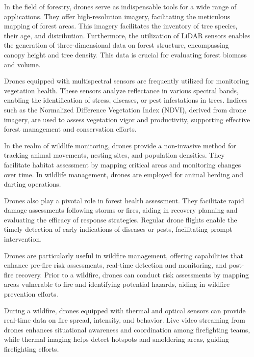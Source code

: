 \documentclass[
  12 pt,
]{Nemilov}
\begin{document}
In the field of forestry, drones serve as indispensable tools for a wide range of applications. They offer high-resolution imagery, facilitating the meticulous mapping of forest areas. This imagery facilitates the inventory of tree species, their age, and distribution. Furthermore, the utilization of LiDAR sensors enables the generation of three-dimensional data on forest structure, encompassing canopy height and tree density. This data is crucial for evaluating forest biomass and volume.

Drones equipped with multispectral sensors are frequently utilized for monitoring vegetation health. These sensors analyze reflectance in various spectral bands, enabling the identification of stress, diseases, or pest infestations in trees. Indices such as the Normalized Difference Vegetation Index (NDVI), derived from drone imagery, are used to assess vegetation vigor and productivity, supporting effective forest management and conservation efforts.

In the realm of wildlife monitoring, drones provide a non-invasive method for tracking animal movements, nesting sites, and population densities. They facilitate habitat assessment by mapping critical areas and monitoring changes over time. In wildlife management, drones are employed for animal herding and darting operations.

Drones also play a pivotal role in forest health assessment. They facilitate rapid damage assessments following storms or fires, aiding in recovery planning and evaluating the efficacy of response strategies. Regular drone flights enable the timely detection of early indications of diseases or pests, facilitating prompt intervention.

Drones are particularly useful in wildfire management, offering capabilities that enhance pre-fire risk assessments, real-time detection and monitoring, and post-fire recovery. Prior to a wildfire, drones can conduct risk assessments by mapping areas vulnerable to fire and identifying potential hazards, aiding in wildfire prevention efforts.

During a wildfire, drones equipped with thermal and optical sensors can provide real-time data on fire spread, intensity, and behavior. Live video streaming from drones enhances situational awareness and coordination among firefighting teams, while thermal imaging helps detect hotspots and smoldering areas, guiding firefighting efforts.
\end{document}
